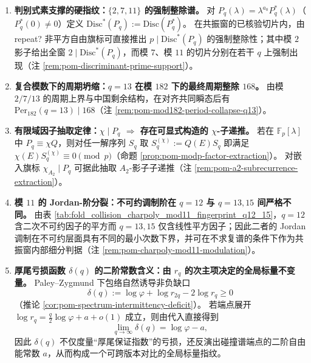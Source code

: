 \begin{enumerate}
  \item \textbf{判别式素支撑的硬指纹：\(\{2,7,11\}\) 的强制整除谱。}
  对 \(P_q(\lambda)=\lambda^{a_0}P_q^\ast(\lambda)\)（\(P_q^\ast(0)\ne 0\)）定义 \(\mathrm{Disc}^\ast(P_q):=\mathrm{Disc}(P_q^\ast)\)。
  在共振窗的已核验切片内，由 repeat? 非平方自由旗标可直接推出 \(p\mid \mathrm{Disc}^\ast(P_q)\) 的强制整除性；其中模 \(2\) 影子给出全窗 \(2\mid \mathrm{Disc}^\ast(P_q)\)，而模 \(7\)、模 \(11\) 的切片分别在若干 \(q\) 上强制出现（注 \ref{rem:pom-discriminant-prime-support}）。

  \item \textbf{复合模数下的周期坍缩：\texorpdfstring{$q=13$}{q=13} 在模 \texorpdfstring{$182$}{182} 下的最终周期整除 \texorpdfstring{$168$}{168}。}
  由模 \(2/7/13\) 的周期上界与中国剩余结构，在对齐共同瞬态后有 \(\mathrm{Per}_{182}(q=13)\mid 168\)（注 \ref{rem:pom-mod182-period-collapse-q13}）。

  \item \textbf{有限域因子抽取定律：\texorpdfstring{$\chi\mid P_q$}{chi|Pq} \texorpdfstring{$\Rightarrow$}{=>} 存在可显式构造的 \texorpdfstring{$\chi$}{chi}-子递推。}
  若在 \(\mathbb{F}_p[\lambda]\) 中 \(P_q\equiv \chi Q\)，则对任一解序列 \(S_q\) 取 \(S_q^{(\chi)}:=Q(E)S_q\) 即满足 \(\chi(E)S_q^{(\chi)}\equiv 0\pmod p\)（命题 \ref{prop:pom-modp-factor-extraction}）。
  对嵌入旗标 \(\chi_{A_2}\mid P_q\) 可据此抽取 \(A_2\)-影子子递推（注 \ref{rem:pom-a2-subrecurrence-extraction}）。

  \item \textbf{模 \texorpdfstring{$11$}{11} 的 Jordan-阶分裂：不可约调制阶在 \texorpdfstring{$q=12$}{q=12} 与 \texorpdfstring{$q=13,15$}{q=13,15} 间严格不同。}
  由表 \ref{tab:fold_collision_charpoly_mod11_fingerprint_q12_15}，\(q=12\) 含二次不可约因子的平方而 \(q=13,15\) 仅含线性平方因子；因此二者的 Jordan 调制在不可约层面具有不同的最小次数下界，并可在不求复谱的条件下作为共振窗内部细分判据（注 \ref{rem:pom-charpoly-mod11-modulation}）。

  \item \textbf{厚尾亏损函数 \texorpdfstring{$\delta(q)$}{delta(q)} 的二阶常数含义：由 \texorpdfstring{$r_q$}{rq} 的次主项决定的全局标量不变量。}
  Paley--Zygmund 下包络自然诱导非负缺口
  \[
  \delta(q):=\log\varphi+\log r_{2q}-2\log r_q\ge 0
  \]
  （推论 \ref{cor:pom-spectrum-intermittency-deficit}）。
  若端点展开 \(\log r_q=\frac{q}{2}\log\varphi+a+o(1)\) 成立，则由代入直接得到
  \[
  \lim_{q\to\infty}\delta(q)=\log\varphi-a,
  \]
  因此 \(\delta(q)\) 不仅度量“厚尾保证指数”的亏损，还反演出碰撞谱端点的二阶自由能常数 \(a\)，从而构成一个可跨版本对比的全局标量指纹。


\end{enumerate}
